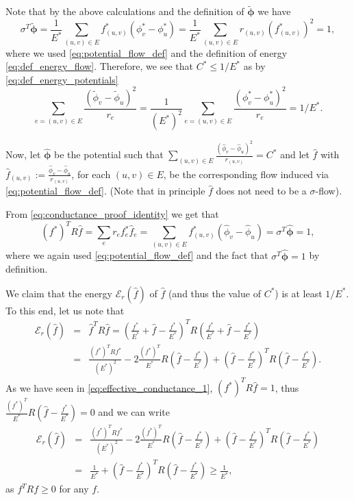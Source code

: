 \documentclass[11pt, letterpaper]{article}
\newcommand{\energy}[2]{\mathcal{E}_{#1}(#2)}
\newcommand{\hf}{\hat{f}}
\newcommand{\vsigma}{\boldsymbol{\mathit{\sigma}}}
\newcommand{\hphi}{\widehat{\phi}}
\newcommand{\tphi}{\widetilde{\phi}}
\newcommand{\hvphi}{\boldsymbol{\widehat{\phi}}}
\newcommand{\tvphi}{\boldsymbol{\tilde{\phi}}}
\newcommand{\ff}{\boldsymbol{\mathit{f}}}
\newcommand{\hff}{\boldsymbol{\mathit{\hat{f}}}}
\newcommand{\rr}{\boldsymbol{\mathit{r}}}
\newcommand{\RR}{\boldsymbol{\mathit{R}}}
\begin{document}
Note that by the above calculations and the definition of $\tvphi$ we have 
\begin{equation}
\label{eq:effective_conductance_2}
\vsigma^T \tvphi = \frac{1}{E^*} \sum_{(u,v)\in E} f^*_{(u,v)} (\phi_v^*-\phi_u^*) = \frac{1}{E^*} \sum_{(u,v)\in E} r_{(u,v)} (f^*_{(u,v)})^2 = 1,
\end{equation}
where we used \eqref{eq:potential_flow_def} and the definition of energy \eqref{eq:def_energy_flow}. Therefore, we see that $C^*\leq 1/E^*$ as by \eqref{eq:def_energy_potentials}
\begin{equation}
\label{eq:effective_conductance_3}
\sum_{e=(u,v)\in E} \frac{(\tphi_v-\tphi_u)^2}{r_{e}}=\frac{1}{(E^*)^2} \sum_{e=(u,v)\in E} \frac{(\phi_v^*-\phi_u^*)^2}{r_{e}} =1/E^*.
\end{equation}


Now, let $\hvphi$ be the potential such that $\sum_{(u,v)\in E} \frac{(\hphi_v-\hphi_u)^2}{r_{(u,v)}}=C^*$ and let $\hff$ with $\hf_{(u,v)} := \frac{\hphi_v-\hphi_u}{r_{(u,v)}}$, for each $(u,v)\in E$, be the corresponding flow induced via \ref{eq:potential_flow_def}. (Note that in principle  $\hff$ does not need to be a $\vsigma$-flow).

From \eqref{eq:conductance_proof_identity} we get that 
\begin{equation}
\label{eq:effective_conductance_1}
(\ff^*)^T \RR \hff = \sum_{e} r_e f^*_e \hf_e = \sum_{(u,v)\in E} f^*_{(u,v)} (\hphi_v-\hphi_u) = \vsigma^T\hvphi= 1,
\end{equation}
where we again used \eqref{eq:potential_flow_def} and the fact that $\vsigma^T\hvphi=1$ by definition.

We claim that the energy $\energy{\rr}{\hff}$ of $\hff$ (and thus the value of $C^*$) is at least $1/E^*$. To this end, let us note that
\begin{eqnarray*}
\energy{\rr}{\hff} &= &\hff^T \RR \hff = \left( \frac{\ff^*}{E^*} + \hff - \frac{\ff^*}{E^*} \right)^T\RR\left( \frac{\ff^*}{E^*} + \hff - \frac{\ff^*}{E^*} \right)\\
&=&\frac{(\ff^*)^T \RR \ff^*}{(E^*)^2} - 2 \frac{(\ff^*)^T}{E^*}\RR\left(\hff - \frac{\ff^*}{E^*} \right) + \left( \hff - \frac{\ff^*}{E^*} \right)^T\RR\left(\hff - \frac{\ff^*}{E^*} \right).
\end{eqnarray*}
As we have seen in \eqref{eq:effective_conductance_1}, $(\ff^*)^T \RR \hff=1$, thus $\frac{(\ff^*)^T}{E^*}\RR\left(\hff - \frac{\ff^*}{E^*} \right)=0$ and we can write
\begin{eqnarray*}
\energy{\rr}{\hff} &=&\frac{(\ff^*)^T\RR \ff^*}{(E^*)^2} - 2 \frac{(\ff^*)^T}{E^*}\RR\left(\hff - \frac{\ff^*}{E^*} \right) + \left( \hff - \frac{\ff^*}{E^*} \right)^T\RR\left(\hff - \frac{\ff^*}{E^*} \right)\\
&=&\frac{1}{E^*} + \left( \hff - \frac{\ff^*}{E^*} \right)^T\RR\left(\hff - \frac{\ff^*}{E^*} \right)\geq \frac{1}{E^*},
\end{eqnarray*}
as $\ff^T\RR \ff\geq 0$ for any $\ff$. 
\end{document}

